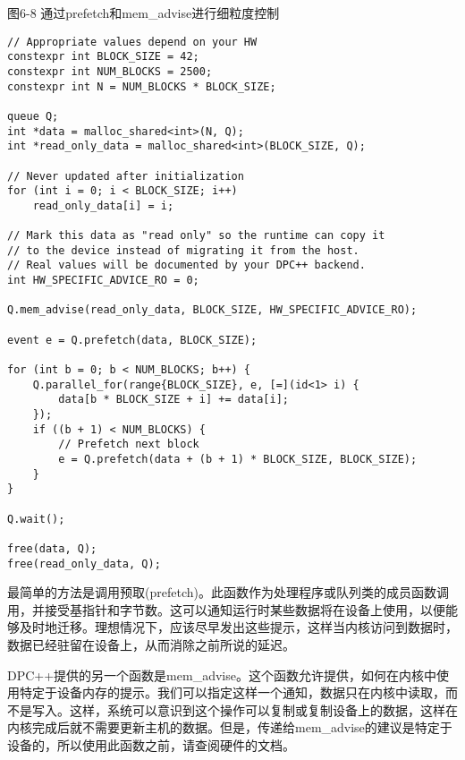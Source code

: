 \hspace*{\fill} \par %
图6-8 通过prefetch和mem\_advise进行细粒度控制
\begin{lstlisting}[caption={}]
// Appropriate values depend on your HW
constexpr int BLOCK_SIZE = 42;
constexpr int NUM_BLOCKS = 2500;
constexpr int N = NUM_BLOCKS * BLOCK_SIZE;

queue Q;
int *data = malloc_shared<int>(N, Q);
int *read_only_data = malloc_shared<int>(BLOCK_SIZE, Q);

// Never updated after initialization
for (int i = 0; i < BLOCK_SIZE; i++)
	read_only_data[i] = i;
	
// Mark this data as "read only" so the runtime can copy it
// to the device instead of migrating it from the host.
// Real values will be documented by your DPC++ backend.
int HW_SPECIFIC_ADVICE_RO = 0;

Q.mem_advise(read_only_data, BLOCK_SIZE, HW_SPECIFIC_ADVICE_RO);

event e = Q.prefetch(data, BLOCK_SIZE);

for (int b = 0; b < NUM_BLOCKS; b++) {
	Q.parallel_for(range{BLOCK_SIZE}, e, [=](id<1> i) {
		data[b * BLOCK_SIZE + i] += data[i];
	});
	if ((b + 1) < NUM_BLOCKS) {
		// Prefetch next block
		e = Q.prefetch(data + (b + 1) * BLOCK_SIZE, BLOCK_SIZE);
	}
}

Q.wait();

free(data, Q);
free(read_only_data, Q);
\end{lstlisting}

最简单的方法是调用预取(prefetch)。此函数作为处理程序或队列类的成员函数调用，并接受基指针和字节数。这可以通知运行时某些数据将在设备上使用，以便能够及时地迁移。理想情况下，应该尽早发出这些提示，这样当内核访问到数据时，数据已经驻留在设备上，从而消除之前所说的延迟。\par

DPC++提供的另一个函数是mem\_advise。这个函数允许提供，如何在内核中使用特定于设备内存的提示。我们可以指定这样一个通知，数据只在内核中读取，而不是写入。这样，系统可以意识到这个操作可以复制或复制设备上的数据，这样在内核完成后就不需要更新主机的数据。但是，传递给mem\_advise的建议是特定于设备的，所以使用此函数之前，请查阅硬件的文档。\par

















